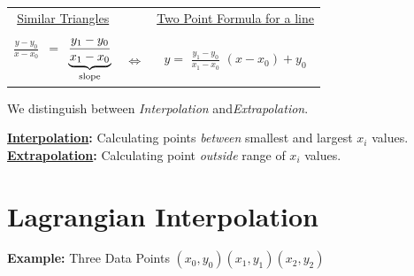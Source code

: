 \documentclass[a4paper,12pt]{report}
\begin{document}
\begin{center}
\begin{tabular}{ccc}
	\underline{Similar Triangles}&&\underline{Two Point Formula for a line}\\ \\
	\Large{$\frac{y-y_0}{x-x_0}$}\, \normalsize{$=$} \,{$\underbrace{\Large{\frac{y_1-y_0}{x_1-x_0}}}_{\text{slope}}$}
		& \Large{$\Leftrightarrow$}
		& $y =$ \Large{$\frac{y_1-y_0}{x_1-x_0}$}\!\! \normalsize{$(x-x_0) + y_0$}\\
	
\end{tabular}
\end{center}

	We distinguish between \textit{Interpolation} and\textit{Extrapolation}.

\begin{center}
\fbox
{
	\parbox{0.8\textwidth}
	{
			\textbf{\underline{Interpolation}:} Calculating points \textit{between} smallest and largest $x_i$ values.\\
			\textbf{\underline{Extrapolation}:} Calculating point \textit{outside} range of $x_i$ values.\\
	
	}
}
\end{center}

\section{Lagrangian Interpolation}


	\noindent \textbf{Example:} Three Data Points $(x_0,y_0)(x_1,y_1)(x_2,y_2)$
\end{document}
